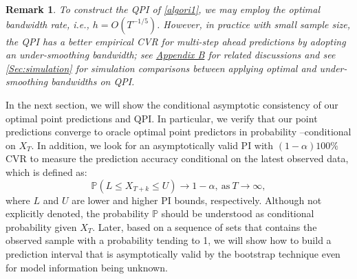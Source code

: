\documentclass[a4paper]{article}
\newtheorem*{Remarknn}{Remark}
\begin{document}
\begin{Remarknn}
 To construct the QPI of \cref{algori1}, we may employ the optimal 
bandwidth rate, i.e., $h = O(T^{-1/5})$. However, in practice with small sample size, the QPI has a better empirical CVR for multi-step ahead predictions by adopting an under-smoothing bandwidth; see \hyperref[Appendix:advanQPI]{Appendix B} for related discussions and see \cref{Sec:simulation} for simulation comparisons between applying optimal and under-smoothing bandwidths on QPI.
\end{Remarknn}

In the next section, we will show the conditional asymptotic 
consistency of our optimal point predictions and QPI. In particular, we verify that our point predictions converge to oracle optimal point predictors in probability --conditional on $X_T$.
In addition, we look for an asymptotically valid PI with $(1-\alpha)100\%$ CVR to measure the prediction accuracy conditional on the latest observed data, which is defined as:
\begin{equation}
    \mathbb{P}(L \leq X_{T+k} \leq U) \to 1-\alpha,~\text{as}~T\overset{}{\to}\infty,
\end{equation}
where $L$ and $U$ are lower and higher PI bounds, respectively. Although not
explicitly denoted, the probability $\mathbb{P}$ should be understood as conditional probability given $X_T$. Later, based on a sequence of sets that contains the observed sample with a probability tending to 1, we will show how to build a prediction interval that is asymptotically valid by the bootstrap technique even for model information being unknown. 
\end{document}

